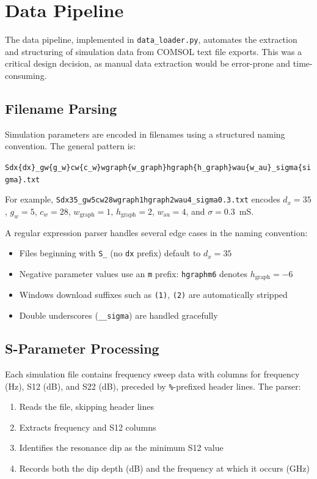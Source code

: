 \documentclass[12pt,a4paper]{report}
\begin{document}
\section{Data Pipeline}
\label{sec:data_pipeline}

The data pipeline, implemented in \texttt{data\_loader.py}, automates the extraction and structuring of simulation data from COMSOL text file exports. This was a critical design decision, as manual data extraction would be error-prone and time-consuming.

\subsection{Filename Parsing}

Simulation parameters are encoded in filenames using a structured naming convention. The general pattern is:

\begin{center}
\texttt{Sdx\{dx\}\_gw\{g\_w\}cw\{c\_w\}wgraph\{w\_graph\}hgraph\{h\_graph\}wau\{w\_au\}\_sigma\{sigma\}.txt}
\end{center}

\noindent For example, \texttt{Sdx35\_gw5cw28wgraph1hgraph2wau4\_sigma0.3.txt} encodes $d_x = 35$, $g_w = 5$, $c_w = 28$, $w_{\text{graph}} = 1$, $h_{\text{graph}} = 2$, $w_{\text{au}} = 4$, and $\sigma = 0.3$~mS.

A regular expression parser handles several edge cases in the naming convention:
\begin{itemize}[leftmargin=2cm]
    \item Files beginning with \texttt{S\_} (no \texttt{dx} prefix) default to $d_x = 35$
    \item Negative parameter values use an \texttt{m} prefix: \texttt{hgraphm6} denotes $h_{\text{graph}} = -6$
    \item Windows download suffixes such as \texttt{(1)}, \texttt{(2)} are automatically stripped
    \item Double underscores (\texttt{\_\_sigma}) are handled gracefully
\end{itemize}

\subsection{S-Parameter Processing}

Each simulation file contains frequency sweep data with columns for frequency (Hz), S12 (dB), and S22 (dB), preceded by \texttt{\%}-prefixed header lines. The parser:
\begin{enumerate}[leftmargin=2cm]
    \item Reads the file, skipping header lines
    \item Extracts frequency and S12 columns
    \item Identifies the resonance dip as the minimum S12 value
    \item Records both the dip depth (dB) and the frequency at which it occurs (GHz)
\end{enumerate}
\end{document}
